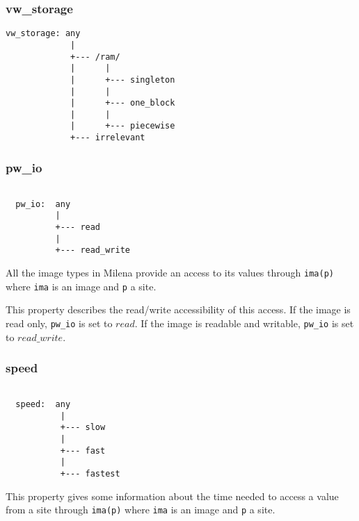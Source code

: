 \subsubsection{vw\_storage}

\begin{verbatim}
vw_storage: any
             |
             +--- /ram/
             |      |
             |      +--- singleton
             |      |
             |      +--- one_block
             |      |
             |      +--- piecewise
             +--- irrelevant
\end{verbatim}



\subsubsection{pw\_io}

\begin{verbatim}

  pw_io:  any
          |
          +--- read
          |
          +--- read_write
\end{verbatim}


All the image types in Milena provide an access to its values through
\verb+ima(p)+ where \verb+ima+ is an image and \verb+p+ a site.

This property describes the read/write accessibility of this access.
If the image is read only, \verb+pw_io+ is set to $read$.
If the image is readable and writable, \verb+pw_io+ is set to $read\_write$.\\



\subsubsection{speed}

\begin{verbatim}

  speed:  any
           |
           +--- slow
           |
           +--- fast
           |
           +--- fastest
\end{verbatim}

  This property gives some information about the time needed to access a
value from a site through \verb+ima(p)+ where \verb+ima+ is an image and
\verb+p+ a site.


